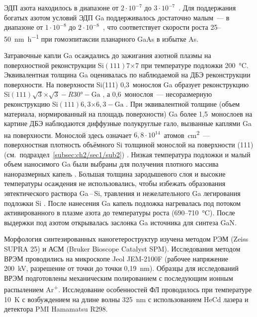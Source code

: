 ЭДП азота находилось в диапазоне от \(2 \cdot 10^{-7}\) до \(3 \cdot
10^{-7}\)~\si{\torr}. Для поддержания богатых азотом условий ЭДП Ga
поддерживалось достаточно малым~--- в диапазоне от \(1 \cdot 10^{-8}\) до \(2
\cdot 10^{-8}\)~\si{\torr}, что соответствует скорости роста
25--50~\si{\nano\meter\per\hour} при гомоэпитаксии планарного GaAs в избытке
As.

Затравочные капли Ga осаждались до зажигания азотной плазмы на поверхностной
реконструкции Si\((111)7\)\(\times\)\(7\) при температуре подложки
200~\si{\degreeCelsius}. Эквивалентная толщина Ga оценивалась по наблюдаемой на
ДБЭ реконструкции поверхности. На поверхности Si(111) 0,3~монослоя Ga образует
реконструкцию Si\((111)\sqrt{3}\)\(\times\)\(\sqrt{3} - R30\si{\degree} -
\text{Ga}\) \cite{Kawazu1988}, а 0,6~монослоя~--- несоразмерную реконструкцию
Si\((111)6,3\)\(\times\)\(6,3 - \text{Ga}\) \cite{Cechal2007}. При
эквивалентной толщине (объем материала, нормированный на площадь поверхности)
Ga более 1,5~монослоев на картине ДБЭ наблюдаются диффузные полукруглые гало,
вызванные каплями Ga на поверхности. Монослой здесь означает \(6,8 \cdot
10^{14}\)~атомов\si{\per\centi\meter^{2}}~--- поверхностная плотность объёмного
Si толщиной монослой на поверхности (111)
(см.~подраздел~\cref{subsec:ch2/sec1/sub2}) \cite{Kumar2010}. Низкая
температура подложки и малый объем наносимого Ga были выбраны для получения
плотного массива наноразмерных капель \cite{Ristic2008}. Большая толщина
зародышевого слоя и высокие температуры осаждения не использовались, чтобы
избежать образования эвтектического раствора Ga\,--\,Si, травления и
нежелательного Ga легирования подложки Si \cite{Yamane2009, Dadgar2015}. После
нанесения Ga капель подложка нагревалась под потоком активированного в плазме
азота до температуры роста (690--710~\si{\degreeCelsius}). После выдержки под
азотом открывалась заслонка Ga источника для синтеза GaN.

Морфология синтезированных наногетероструктур изучена методом PЭМ (Zeiss SUPRA
25) и АСМ (Bruker Bioscope Catalyst SPM). Исследования методом ВРЭМ проводились
на микроскопе Jeol JEM-2100F (рабочее напряжение 200~\si{\kilo\volt},
разрешение от точки до точки 0,19~\si{\nano\meter}). Образцы для исследований
ВРЭМ подготовлены механическим полированием с последующим ионным распылением
Ar\textsuperscript{+}. Исследование особенностей ФЛ проводилось при температуре
10~\si{\kelvin} с возбуждением на длине волны 325~\si{\nano\meter} с
использованием HeCd лазера и детектора PMI Hamamatsu R298.

